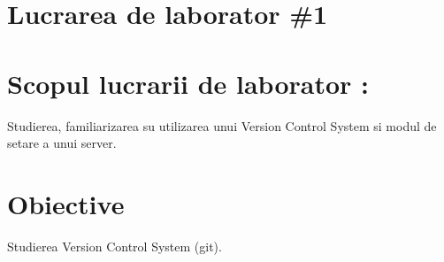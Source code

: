 \section*{Lucrarea de laborator \#1}

\section{Scopul lucrarii de laborator :}
Studierea, familiarizarea su utilizarea unui Version Control System si modul de setare a unui server.

\section{Obiective}
Studierea Version Control System (git).

\clearpage